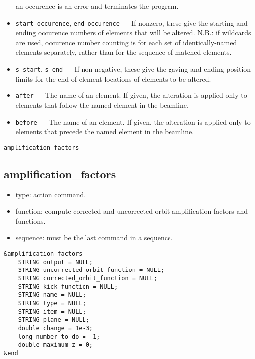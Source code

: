\documentclass[11pt]{article}
\begin{document}
\begin{itemize}
        an occurence is an error and terminates the program.
\item \verb|start_occurence|, \verb|end_occurence| --- If nonzero, these give the starting and
 ending occurence numbers of elements that will be altered.  N.B.: if wildcards are used, occurence
 number counting is for each set of identically-named elements separately, rather than for the sequence
 of matched elements.
\item \verb|s_start|, \verb|s_end| --- If non-negative, these give the gaving and ending position
 limits for the end-of-element locations of elements to be altered.
\item \verb|after| --- The name of an element.  If given, the alteration is applied only to elements
 that follow the named element in the beamline.  
\item \verb|before| --- The name of an element.  If given, the alteration is applied only to elements
 that precede the named element in the beamline. 
\end{itemize}

\newpage
\begin{center}{\Large\verb|amplification_factors|}\end{center}
\subsection{amplification\_factors \label{subsec:amplificationfactors}}

\begin{itemize}
\item type: action command.
\item function: compute corrected and uncorrected orbit amplification factors and functions.
\item sequence: must be the last command in a sequence.
\end{itemize}

\begin{verbatim}
&amplification_factors
    STRING output = NULL;
    STRING uncorrected_orbit_function = NULL;
    STRING corrected_orbit_function = NULL;
    STRING kick_function = NULL;
    STRING name = NULL;
    STRING type = NULL;
    STRING item = NULL;
    STRING plane = NULL;
    double change = 1e-3;
    long number_to_do = -1;
    double maximum_z = 0;
&end
\end{verbatim}
\end{document}
